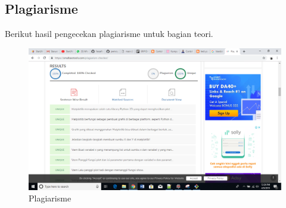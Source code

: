 \subsection{Plagiarisme}
Berikut hasil pengecekan plagiarisme untuk bagian teori.
\begin{figure}[H]
	\includegraphics[width=12cm]{figures/6/1174042/plagiat.png}
	\centering
	\caption{Plagiarisme}
\end{figure}